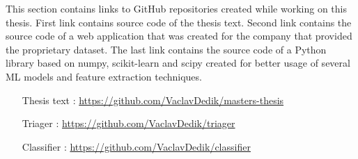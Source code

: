 \documentclass[nopalatino,nolot,nolof,color]{fithesis3}
\begin{document}
 This section contains links to GitHub repositories created while working on this thesis. First link contains source code of the thesis text. Second link contains the source code of a web application that was created for the company that provided the proprietary dataset. The last link contains the source code of a Python library based on numpy, scikit-learn and scipy created for better usage of several ML models and feature extraction techniques.

 \begin{itemize}
   \item[Thesis text]: \url{https://github.com/VaclavDedik/masters-thesis}
   \item[Triager]: \url{https://github.com/VaclavDedik/triager}
   \item[Classifier]: \url{https://github.com/VaclavDedik/classifier}
 \end{itemize}

 \todos
\end{document}
